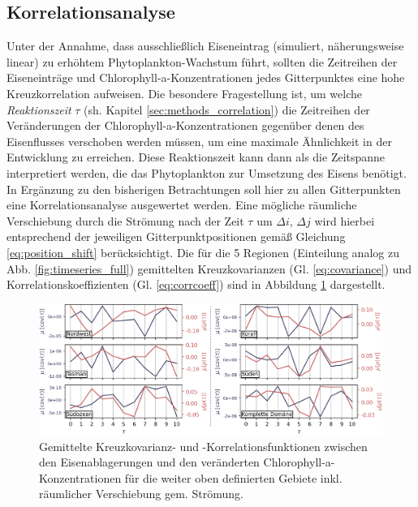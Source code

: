 \documentclass[12pt,a4paper,onecolumn,headheight=30pt]{scrartcl}
\begin{document}
\subsection{Korrelationsanalyse} \label{sec:correlation_analysis}
Unter der Annahme, dass ausschließlich Eiseneintrag (simuliert, näherungsweise linear) zu erhöhtem Phytoplankton-Wachstum führt, sollten die Zeitreihen der Eiseneinträge und Chlorophyll-a-Konzentrationen jedes Gitterpunktes eine hohe Kreuzkorrelation aufweisen. Die besondere Fragestellung ist, um welche \textit{Reaktionszeit} $\tau$ (sh. Kapitel \ref{sec:methods_correlation}) die Zeitreihen der Veränderungen der Chlorophyll-a-Konzentrationen gegenüber denen des Eisenflusses verschoben werden müssen, um eine maximale Ähnlichkeit in der Entwicklung zu erreichen. Diese Reaktionszeit kann dann als die Zeitspanne interpretiert werden, die das Phytoplankton zur Umsetzung des Eisens benötigt. In Ergänzung zu den bisherigen Betrachtungen soll hier zu allen Gitterpunkten eine Korrelationsanalyse ausgewertet werden. Eine mögliche räumliche Verschiebung durch die Strömung nach der Zeit $\tau$ um $\Delta i$, $\Delta j$ wird hierbei entsprechend der jeweiligen Gitterpunktpositionen gemäß Gleichung \ref{eq:position_shift} berücksichtigt. Die für die 5 Regionen (Einteilung analog zu Abb. \ref{fig:timeseries_full}) gemittelten Kreuzkovarianzen (Gl. \ref{eq:covariance}) und Korrelationskoeffizienten (Gl. \ref{eq:corrcoeff}) sind in Abbildung \ref{fig:section_cross_corr} dargestellt.
\begin{figure}[htbp]
\includegraphics[width=\textwidth]{bilder/section_crosscorr_noadv.png}
\caption{Gemittelte Kreuzkovarianz- und -Korrelationsfunktionen zwischen den Eisenablagerungen und den veränderten Chlorophyll-a-Konzentrationen für die weiter oben definierten Gebiete inkl. räumlicher Verschiebung gem. Strömung.} \label{fig:section_cross_corr}
\end{figure}
\end{document}
